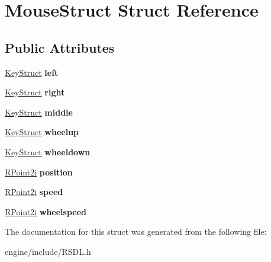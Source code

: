 \hypertarget{structMouseStruct}{
\section{MouseStruct Struct Reference}
\label{structMouseStruct}
}
\subsection*{Public Attributes}
\begin{DoxyCompactItemize}
\item 
\hypertarget{structMouseStruct_a251ff02d33b9903cb5cd8f9e33590ec4}{
\hyperlink{structKeyStruct}{KeyStruct} {\bfseries left}}
\label{structMouseStruct_a251ff02d33b9903cb5cd8f9e33590ec4}

\item 
\hypertarget{structMouseStruct_a9648c56a8f1c04c3ca39b6dae930a26e}{
\hyperlink{structKeyStruct}{KeyStruct} {\bfseries right}}
\label{structMouseStruct_a9648c56a8f1c04c3ca39b6dae930a26e}

\item 
\hypertarget{structMouseStruct_a0533f4e13a240426a1deb0f92e7c3cc7}{
\hyperlink{structKeyStruct}{KeyStruct} {\bfseries middle}}
\label{structMouseStruct_a0533f4e13a240426a1deb0f92e7c3cc7}

\item 
\hypertarget{structMouseStruct_ad25364a6968748180cd20868c9765d68}{
\hyperlink{structKeyStruct}{KeyStruct} {\bfseries wheelup}}
\label{structMouseStruct_ad25364a6968748180cd20868c9765d68}

\item 
\hypertarget{structMouseStruct_ac642c0db4c6a27c49e2642a7182fb476}{
\hyperlink{structKeyStruct}{KeyStruct} {\bfseries wheeldown}}
\label{structMouseStruct_ac642c0db4c6a27c49e2642a7182fb476}

\item 
\hypertarget{structMouseStruct_a409dc6ce16cb1cc2615cfc0c8a715918}{
\hyperlink{classRPoint2i}{RPoint2i} {\bfseries position}}
\label{structMouseStruct_a409dc6ce16cb1cc2615cfc0c8a715918}

\item 
\hypertarget{structMouseStruct_af080e59430def924714674365454f8a3}{
\hyperlink{classRPoint2i}{RPoint2i} {\bfseries speed}}
\label{structMouseStruct_af080e59430def924714674365454f8a3}

\item 
\hypertarget{structMouseStruct_a7c167349789bcef4717211ad360a6d69}{
\hyperlink{classRPoint2i}{RPoint2i} {\bfseries wheelspeed}}
\label{structMouseStruct_a7c167349789bcef4717211ad360a6d69}

\end{DoxyCompactItemize}


The documentation for this struct was generated from the following file:\begin{DoxyCompactItemize}
\item 
engine/include/RSDL.h\end{DoxyCompactItemize}

